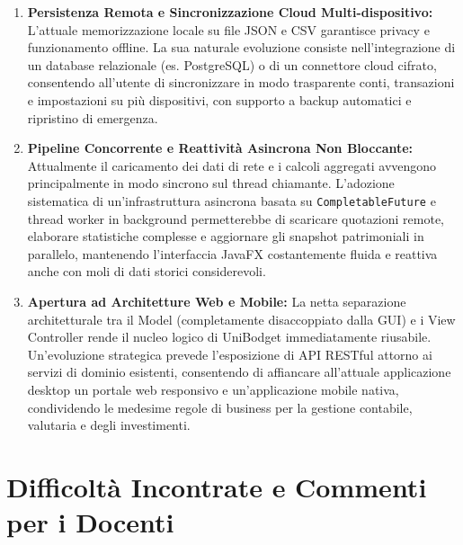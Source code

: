 \documentclass[11pt,a4paper,openright]{report}
\begin{document}
\begin{enumerate}[noitemsep,topsep=2pt]
  \item \textbf{Persistenza Remota e Sincronizzazione Cloud Multi-dispositivo:}
  L'attuale memorizzazione locale su file JSON e CSV garantisce privacy e funzionamento offline. La sua naturale evoluzione consiste nell'integrazione di un database relazionale (es. PostgreSQL) o di un connettore cloud cifrato, consentendo all'utente di sincronizzare in modo trasparente conti, transazioni e impostazioni su più dispositivi, con supporto a backup automatici e ripristino di emergenza.

  \item \textbf{Pipeline Concorrente e Reattività Asincrona Non Bloccante:}
  Attualmente il caricamento dei dati di rete e i calcoli aggregati avvengono principalmente in modo sincrono sul thread chiamante. L'adozione sistematica di un'infrastruttura asincrona basata su \texttt{CompletableFuture} e thread worker in background permetterebbe di scaricare quotazioni remote, elaborare statistiche complesse e aggiornare gli snapshot patrimoniali in parallelo, mantenendo l'interfaccia JavaFX costantemente fluida e reattiva anche con moli di dati storici considerevoli.

  \item \textbf{Apertura ad Architetture Web e Mobile:}
  La netta separazione architetturale tra il Model (completamente disaccoppiato dalla GUI) e i View Controller rende il nucleo logico di UniBodget immediatamente riusabile. Un'evoluzione strategica prevede l'esposizione di API RESTful attorno ai servizi di dominio esistenti, consentendo di affiancare all'attuale applicazione desktop un portale web responsivo e un'applicazione mobile nativa, condividendo le medesime regole di business per la gestione contabile, valutaria e degli investimenti.
\end{enumerate}


\section{Difficoltà Incontrate e Commenti per i Docenti}
\end{document}
